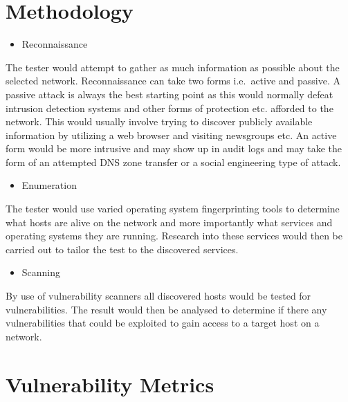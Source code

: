 

  \section{Methodology}\label{sec:methodology-utilized}

    \begin{itemize}
      \tightlist \item Reconnaissance
    \end{itemize}

    The tester would attempt to gather as much information as possible about
    the selected network. Reconnaissance can take two forms i.e.~active and
    passive. A passive attack is always the best starting point as this
    would normally defeat intrusion detection systems and other forms of
    protection etc. afforded to the network. This would usually involve
    trying to discover publicly available information by utilizing a web
    browser and visiting newsgroups etc. An active form would be more
    intrusive and may show up in audit logs and may take the form of an
    attempted DNS zone transfer or a social engineering type of attack.

    \begin{itemize}
      \tightlist \item Enumeration
    \end{itemize}

    The tester would use varied operating system fingerprinting tools to
    determine what hosts are alive on the network and more importantly what
    services and operating systems they are running. Research into these
    services would then be carried out to tailor the test to the discovered
    services.

    \begin{itemize}
      \tightlist \item Scanning
    \end{itemize}

    By use of vulnerability scanners all discovered hosts would be tested
    for vulnerabilities. The result would then be analysed to determine if
    there any vulnerabilities that could be exploited to gain access to a
    target host on a network.

  \section{Vulnerability Metrics}\label{sec:vulnerability-metrics}

